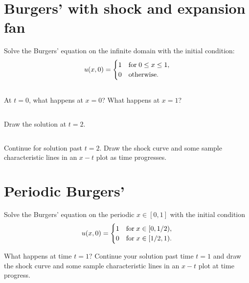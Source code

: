 \documentclass[11pt,letterpaper]{article}
\begin{document}
\section{Burgers' with shock and expansion fan}
Solve the Burgers' equation on the infinite domain with the initial condition:
\begin{align}
    u(x,0) = \begin{cases}
        1 & \text{for\;} 0\leq x\leq 1,\\
        0 & \text{otherwise}.
    \end{cases}
\end{align}

\subsection{}
At $t=0$, what happens at $x=0$? What happens at $x=1$?

\subsection{}
Draw the solution at $t=2$. 

\subsection{}
Continue for solution past $t=2$. Draw the shock curve and some sample characteristic lines in an $x-t$ plot as time progresses. 

\section{Periodic Burgers'}
Solve the Burgers' equation on the periodic $x\in[0,1]$ with the initial condition
\begin{align}
    u(x,0) = \begin{cases}
        1 & \text{for\;} x\in[0,1/2),\\
        0 & \text{for\;} x\in[1/2,1).
    \end{cases}
\end{align}

What happens at time $t=1$? Continue your solution past time $t=1$ and draw the shock curve and some sample characteristic lines in an $x-t$ plot at time progress. 

\newpage
\end{document}
